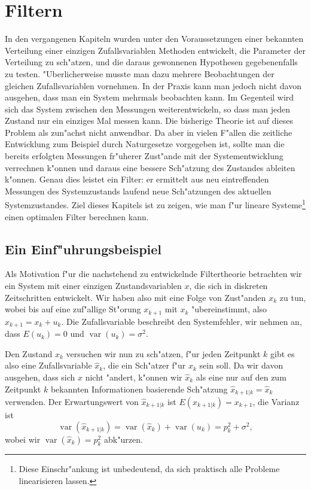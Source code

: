 %
%
%
\chapter{Filtern} \label{chapter-filtern}

In den vergangenen Kapiteln wurden unter den Voraussetzungen einer
bekannten Verteilung einer einzigen Zufallsvariablen Methoden entwickelt,
die Parameter der Verteilung zu sch"atzen, und die daraus gewonnenen
Hypothesen gegebenenfalls zu testen.
"Uberlicherweise musste man dazu
mehrere Beobachtungen der gleichen Zufallsvariablen vornehmen.
In der Praxis kann man jedoch
nicht davon ausgehen, dass man ein System mehrmals beobachten kann.
Im Gegenteil wird sich das System zwischen den Messungen weiterentwickeln,
so dass man jeden Zustand nur ein einziges Mal messen kann.
Die bisherige
Theorie ist auf dieses Problem als zun"achst nicht anwendbar.
Da aber in vielen F"allen die zeitliche Entwicklung zum Beispiel durch
Naturgesetze vorgegeben ist, sollte man die bereits erfolgten Messungen
fr"uherer Zust"ande mit der Systementwicklung verrechnen k"onnen und
daraus eine bessere Sch"atzung des Zustandes ableiten k"onnen.
Genau
dies leistet ein Filter: er ermittelt aus neu eintreffenden Messungen
des Systemzustands laufend neue Sch"atzungen des aktuellen Systemzustandes.
Ziel dieses Kapitels ist zu zeigen, wie man f"ur lineare Systeme\footnote{Diese
Einschr"ankung ist unbedeutend, da sich praktisch alle Probleme linearisieren lassen.}
einen optimalen Filter berechnen kann.

\section{Ein Einf"uhrungsbeispiel}
Als Motivation f"ur die nachstehend zu entwickelnde Filtertheorie betrachten
wir ein System mit einer einzigen Zustandsvariablen $x$, die sich in diskreten
Zeitschritten entwickelt.
Wir haben also mit eine Folge von Zust"anden $x_k$ zu tun, wobei
bis auf eine zuf"allige St"orung $x_{k+1}$ mit $x_k$ "ubereinstimmt,
also $x_{k+1}=x_k+u_k$.
Die Zufallsvariable beschreibt den Systemfehler, wir
nehmen an, dass $E(u_k)=0$ und $\operatorname{var}(u_k)=\sigma^2$.

Den Zustand $x_k$ versuchen wir nun zu sch"atzen, f"ur jeden Zeitpunkt
$k$ gibt es also eine Zufallsvariable $\hat x_k$, die ein Sch"atzer f"ur
$x_k$ sein soll.
Da wir davon ausgehen, dass sich $x$ nicht "andert, k"onnen wir $\hat x_k$
als eine nur auf den zum Zeitpunkt $k$ bekannten Informationen basierende
Sch"atzung $\hat x_{k+1|k}=\hat x_k$ verwenden.
Der Erwartungswert von $\hat x_{k+1|k}$ ist $E(x_{k+1|k})=x_{k+1}$, die Varianz
ist
\[
\operatorname{var}(\hat x_{k+1|k})
=\operatorname{var}(\hat x_k)+\operatorname{var}(u_k)=p_k^2+\sigma^2,
\]
wobei wir $\operatorname{var}(\hat x_k)=p_k^2$ abk"urzen.

